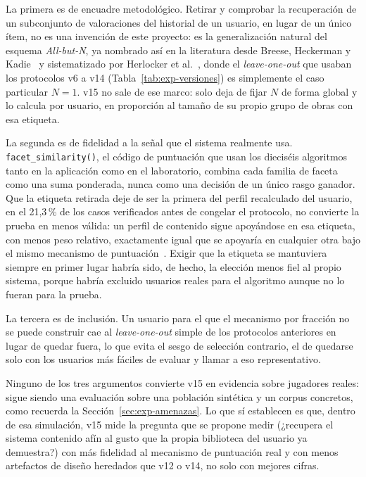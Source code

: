 La primera es de encuadre metodológico. Retirar y comprobar la recuperación de un subconjunto
de valoraciones del historial de un usuario, en lugar de un único ítem, no es una invención de
este proyecto: es la generalización natural del esquema \emph{All-but-N}, ya nombrado así en
la literatura desde Breese, Heckerman y Kadie~\cite{breese1998empirical} y sistematizado por
Herlocker et al.~\cite{herlocker2004evaluating}, donde el \emph{leave-one-out} que usaban los
protocolos v6 a v14 (Tabla~\ref{tab:exp-versiones}) es simplemente el caso particular \(N=1\). v15 no sale de ese marco: solo
deja de fijar \(N\) de forma global y lo calcula por usuario, en proporción al tamaño de su
propio grupo de obras con esa etiqueta.

La segunda es de fidelidad a la señal que el sistema realmente usa. \texttt{facet\_similarity()},
el código de puntuación que usan los dieciséis algoritmos tanto en la aplicación como en el
laboratorio, combina cada familia de faceta como una suma ponderada, nunca como una decisión
de un único rasgo ganador. Que la etiqueta retirada deje de ser la primera del perfil recalculado
del usuario, en el 21{,}3\,\% de los casos verificados antes de congelar el protocolo, no
convierte la prueba en menos válida: un perfil de contenido sigue apoyándose en esa etiqueta,
con menos peso relativo, exactamente igual que se apoyaría en cualquier otra bajo el mismo
mecanismo de puntuación~\cite{pazzani2007content}. Exigir que la etiqueta se mantuviera siempre
en primer lugar habría sido, de hecho, la elección menos fiel al propio sistema, porque
habría excluido usuarios reales para el algoritmo aunque no lo fueran para la prueba.

La tercera es de inclusión. Un usuario para el que el mecanismo por fracción no se puede
construir cae al \emph{leave-one-out} simple de los protocolos anteriores en lugar de quedar
fuera, lo que evita el sesgo de selección contrario, el de quedarse solo con los usuarios más
fáciles de evaluar y llamar a eso representativo.

Ninguno de los tres argumentos convierte v15 en evidencia sobre jugadores reales: sigue siendo
una evaluación sobre una población sintética y un corpus concretos, como recuerda la
Sección~\ref{sec:exp-amenazas}. Lo que sí establecen es que, dentro de esa simulación, v15
mide la pregunta que se propone medir (¿recupera el sistema contenido afín al gusto que la
propia biblioteca del usuario ya demuestra?) con más fidelidad al mecanismo de puntuación real
y con menos artefactos de diseño heredados que v12 o v14, no solo con mejores cifras.


